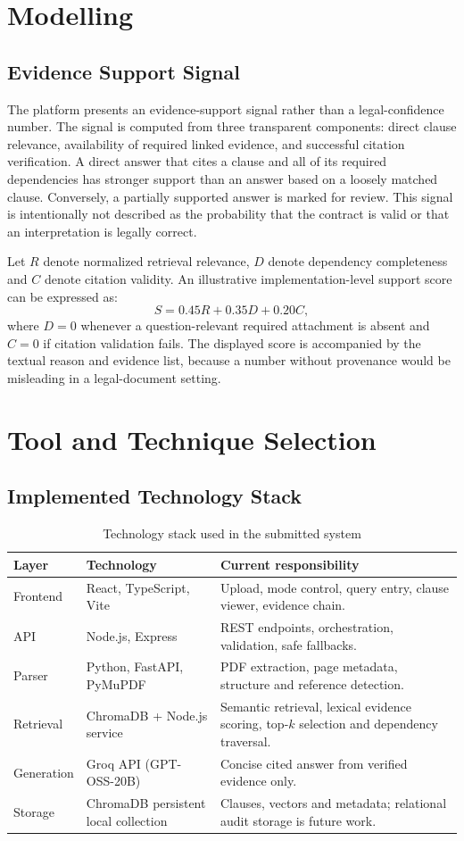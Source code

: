 \documentclass[12pt,a4paper,oneside]{report}
\begin{document}
\section{Modelling}
\subsection{Evidence Support Signal}
The platform presents an evidence-support signal rather than a legal-confidence number. The signal is computed from three transparent components: direct clause relevance, availability of required linked evidence, and successful citation verification. A direct answer that cites a clause and all of its required dependencies has stronger support than an answer based on a loosely matched clause. Conversely, a partially supported answer is marked for review. This signal is intentionally not described as the probability that the contract is valid or that an interpretation is legally correct.

Let \(R\) denote normalized retrieval relevance, \(D\) denote dependency completeness and \(C\) denote citation validity. An illustrative implementation-level support score can be expressed as:
\[
S = 0.45R + 0.35D + 0.20C,
\]
where \(D=0\) whenever a question-relevant required attachment is absent and \(C=0\) if citation validation fails. The displayed score is accompanied by the textual reason and evidence list, because a number without provenance would be misleading in a legal-document setting.

\section{Tool and Technique Selection}
\subsection{Implemented Technology Stack}
\begin{table}[H]
\centering
\begin{tabularx}{\textwidth}{p{}p{}X}
\toprule
\textbf{Layer} & \textbf{Technology} & \textbf{Current responsibility}\\
\midrule
Frontend & React, TypeScript, Vite & Upload, mode control, query entry, clause viewer, evidence chain.\\
API & Node.js, Express & REST endpoints, orchestration, validation, safe fallbacks.\\
Parser & Python, FastAPI, PyMuPDF & PDF extraction, page metadata, structure and reference detection.\\
Retrieval & ChromaDB + Node.js service & Semantic retrieval, lexical evidence scoring, top-\(k\) selection and dependency traversal.\\
Generation & Groq API (GPT-OSS-20B) & Concise cited answer from verified evidence only.\\
Storage & ChromaDB persistent local collection & Clauses, vectors and metadata; relational audit storage is future work.\\
\bottomrule
\end{tabularx}
\caption{Technology stack used in the submitted system}
\end{table}
\end{document}
